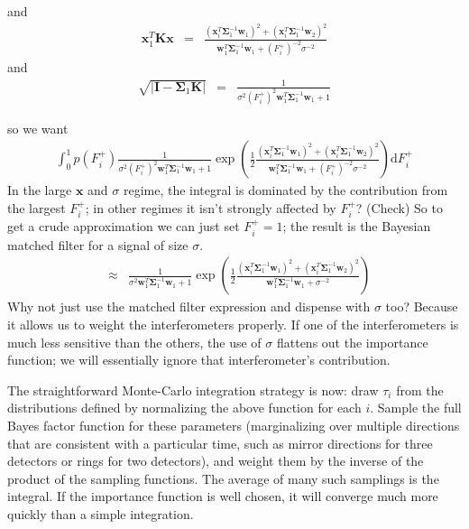 \documentclass{article}
\begin{document}
and
\begin{eqnarray}
\mathbf{x}_1^T\mathbf{K}\mathbf{x}&=&\frac{(\mathbf{x}_i^T\mathbf{\Sigma}^{-1}_1\mathbf{w}_1)^2+(\mathbf{x}_i^T\mathbf{\Sigma}^{-1}_1\mathbf{w}_2)^2}{\mathbf{w}_1^T\mathbf{\Sigma}^{-1}_1\mathbf{w}_1 + (F_i^+)^{-2}\sigma^{-2}}
\end{eqnarray}
and
\begin{eqnarray}
\sqrt{|\mathbf{I}-\mathbf{\Sigma}_1\mathbf{K}|}&=&
\frac{1}{\sigma^2(F_i^+)^2\mathbf{w}_1^T\mathbf{\Sigma}^{-1}_1\mathbf{w}_1+1}
\end{eqnarray}

so we want
\begin{eqnarray}
\int_{0}^1
p(F_i^+)
\frac{1}{\sigma^2(F_i^+)^2\mathbf{w}_1^T\mathbf{\Sigma}^{-1}_1\mathbf{w}_1+1}
\exp(\frac{1}{2}\frac{(\mathbf{x}_i^T\mathbf{\Sigma}^{-1}_1\mathbf{w}_1)^2+(\mathbf{x}_i^T\mathbf{\Sigma}^{-1}_1\mathbf{w}_2)^2}{\mathbf{w}_1^T\mathbf{\Sigma}^{-1}_1\mathbf{w}_1+(F_i^+)^{-2}\sigma^{-2}})
\mathrm{d}F_i^+
\end{eqnarray}
In the large $\mathbf{x}$ and $\sigma$ regime, the integral is dominated by the contribution from the largest $F_i^+$; in other regimes it isn't strongly affected by $F_i^+$? (Check)  So to get a crude approximation we can just set $F_i^+ = 1$; the result is the Bayesian matched filter for a signal of size $\sigma$.
\begin{eqnarray}
&\approx&
\frac{1}{\sigma^2\mathbf{w}_1^T\mathbf{\Sigma}^{-1}_1\mathbf{w}_1+1}
\exp(\frac{1}{2}\frac{(\mathbf{x}_i^T\mathbf{\Sigma}^{-1}_1\mathbf{w}_1)^2+(\mathbf{x}_i^T\mathbf{\Sigma}^{-1}_1\mathbf{w}_2)^2}{\mathbf{w}_1^T\mathbf{\Sigma}^{-1}_1\mathbf{w}_1+\sigma^{-2}})
\end{eqnarray}
Why not just use the matched filter expression and dispense with $\sigma$ too? Because it allows us to weight the interferometers properly.  If one of the interferometers is much less sensitive than the others, the use of $\sigma$ flattens out the importance function; we will essentially ignore that interferometer's contribution.

The straightforward Monte-Carlo integration strategy is now: draw $\tau_i$ from the distributions defined by normalizing the above function for each $i$.  Sample the full Bayes factor function for these parameters (marginalizing over multiple directions that are consistent with a particular time, such as mirror directions for three detectors or rings for two detectors), and weight them by the inverse of the product of the sampling functions.  The average of many such samplings is the integral.  If the importance function is well chosen, it will converge much more quickly than a simple integration.
\end{document}
